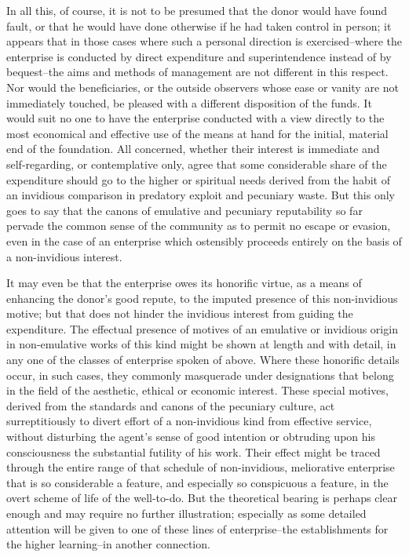 \documentclass[12pt]{report}
\begin{document}
In all this, of course, it is not to be presumed that the donor would
have found fault, or that he would have done otherwise if he had taken
control in person; it appears that in those cases where such a personal
direction is exercised--where the enterprise is conducted by direct
expenditure and superintendence instead of by bequest--the aims and
methods of management are not different in this respect. Nor would the
beneficiaries, or the outside observers whose ease or vanity are not
immediately touched, be pleased with a different disposition of the
funds. It would suit no one to have the enterprise conducted with a view
directly to the most economical and effective use of the means at hand
for the initial, material end of the foundation. All concerned, whether
their interest is immediate and self-regarding, or contemplative only,
agree that some considerable share of the expenditure should go to
the higher or spiritual needs derived from the habit of an invidious
comparison in predatory exploit and pecuniary waste. But this only goes
to say that the canons of emulative and pecuniary reputability so far
pervade the common sense of the community as to permit no escape or
evasion, even in the case of an enterprise which ostensibly proceeds
entirely on the basis of a non-invidious interest.

It may even be that the enterprise owes its honorific virtue, as a means
of enhancing the donor's good repute, to the imputed presence of this
non-invidious motive; but that does not hinder the invidious interest
from guiding the expenditure. The effectual presence of motives of an
emulative or invidious origin in non-emulative works of this kind
might be shown at length and with detail, in any one of the classes of
enterprise spoken of above. Where these honorific details occur, in such
cases, they commonly masquerade under designations that belong in the
field of the aesthetic, ethical or economic interest. These special
motives, derived from the standards and canons of the pecuniary culture,
act surreptitiously to divert effort of a non-invidious kind from
effective service, without disturbing the agent's sense of good
intention or obtruding upon his consciousness the substantial futility
of his work. Their effect might be traced through the entire range
of that schedule of non-invidious, meliorative enterprise that is so
considerable a feature, and especially so conspicuous a feature, in the
overt scheme of life of the well-to-do. But the theoretical bearing is
perhaps clear enough and may require no further illustration; especially
as some detailed attention will be given to one of these lines of
enterprise--the establishments for the higher learning--in another
connection.
\end{document}
